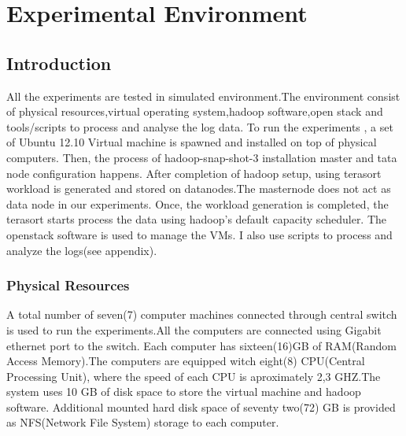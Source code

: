 
\chapter{Experimental Environment} %

\label{Chapter 3} %



\section{Introduction}

All the experiments are tested in simulated environment.The environment consist of physical resources,virtual operating system,hadoop software,open stack and tools/scripts to process and analyse the log data.
To run the experiments , a set of Ubuntu 12.10 Virtual machine is spawned and installed on top of physical computers. Then, the process of hadoop-snap-shot-3 installation master and tata node configuration happens. After completion of hadoop setup, using terasort workload is generated and stored on datanodes.The masternode does not act as data node in our experiments. Once, the workload generation is completed, the terasort starts process the data using hadoop's default capacity scheduler. The openstack software is used to manage the VMs. I also use scripts to process and analyze the logs(see appendix).  

\subsection{Physical Resources}
A total number of seven(7) computer machines connected through central switch is used to run the experiments.All the computers are connected using Gigabit ethernet port to the switch. Each computer has sixteen(16)GB of RAM(Random Access Memory).The computers are equipped witch eight(8) CPU(Central Processing Unit), where the speed of each CPU is aproximately 2,3 GHZ.The system uses 10 GB of disk space to store the virtual machine and hadoop software. Additional mounted hard disk space of seventy two(72) GB is provided as NFS(Network File System) storage to each computer. 

